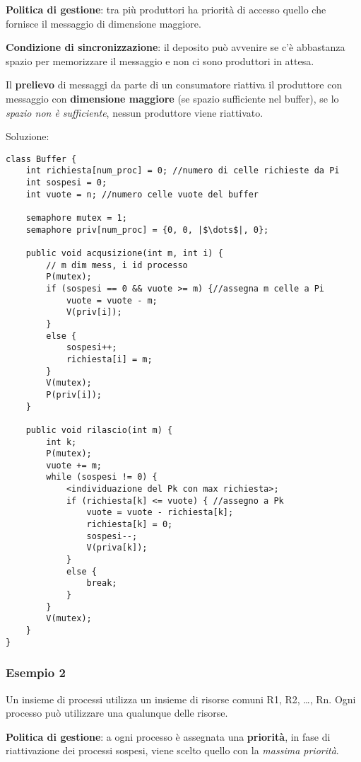 \textbf{Politica di gestione}: tra più produttori ha priorità di accesso quello che fornisce il messaggio di dimensione maggiore.

\textbf{Condizione di sincronizzazione}: il deposito può avvenire se c'è abbastanza spazio per memorizzare il messaggio e non ci sono produttori in attesa.

Il \textbf{prelievo} di messaggi da parte di un consumatore riattiva il produttore con messaggio con \textbf{dimensione maggiore} (se spazio sufficiente nel buffer), se lo \textit{spazio non è sufficiente}, nessun produttore viene riattivato.

Soluzione:
\begin{verbatim}
class Buffer {
    int richiesta[num_proc] = 0; //numero di celle richieste da Pi
    int sospesi = 0;
    int vuote = n; //numero celle vuote del buffer

    semaphore mutex = 1;
    semaphore priv[num_proc] = {0, 0, |$\dots$|, 0};

    public void acqusizione(int m, int i) {
        // m dim mess, i id processo
        P(mutex);
        if (sospesi == 0 && vuote >= m) {//assegna m celle a Pi
            vuote = vuote - m;
            V(priv[i]);
        }
        else {
            sospesi++;
            richiesta[i] = m;
        }
        V(mutex);
        P(priv[i]);
    }
    
    public void rilascio(int m) {
        int k;
        P(mutex);
        vuote += m;
        while (sospesi != 0) {
            <individuazione del Pk con max richiesta>;
            if (richiesta[k] <= vuote) { //assegno a Pk
                vuote = vuote - richiesta[k];
                richiesta[k] = 0;
                sospesi--;
                V(priva[k]);
            }
            else {
                break;
            }
        }
        V(mutex);
    }
}
\end{verbatim}

\subsubsection{Esempio 2}
Un insieme di processi utilizza un insieme di risorse comuni R1, R2, \dots, Rn. Ogni processo può utilizzare una qualunque delle risorse.

\textbf{Politica di gestione}: a ogni processo è assegnata una \textbf{priorità}, in fase di riattivazione dei processi sospesi, viene scelto quello con la \textit{massima priorità}.

